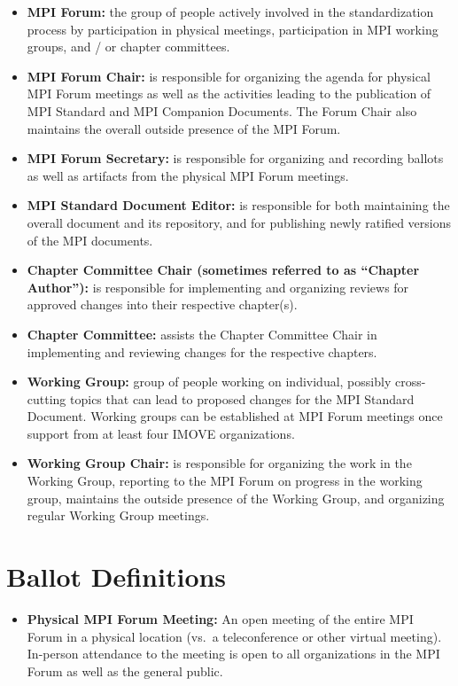 {{\begin{itemize}
\item {\bf MPI Forum:} the group of people actively involved in the
  standardization process by participation in physical meetings,
  participation in MPI working groups, and / or chapter committees.
\item {\bf MPI Forum Chair:} is responsible for organizing the agenda
  for physical MPI Forum meetings as well as the activities leading to the
  publication of MPI Standard and MPI Companion Documents. The Forum
  Chair also maintains the overall outside presence of the MPI Forum.
\item {\bf MPI Forum Secretary:} is responsible for organizing and
  recording ballots as well as artifacts from the physical MPI Forum
  meetings.
\item {\bf MPI Standard Document Editor:} is responsible for both
  maintaining the overall document and its repository, and for
  publishing newly ratified versions of the MPI documents.
\item {\bf Chapter Committee Chair (sometimes referred to as ``Chapter
  Author''):} is responsible for implementing and organizing reviews
  for approved changes into their respective chapter(s).
\item {\bf Chapter Committee:} assists the Chapter Committee Chair in
  implementing and reviewing changes for the respective chapters.
\item {\bf Working Group:} group of people working on individual,
  possibly cross-cutting topics that can lead to proposed changes for
  the MPI Standard Document. Working groups can be established at MPI
  Forum meetings once support from at least four IMOVE organizations.
\item {\bf Working Group Chair:} is responsible for organizing the
  work in the Working Group, reporting to the MPI Forum on progress in
  the working group, maintains the outside presence of the Working
  Group, and organizing regular Working Group meetings.
\end{itemize}

\section{Ballot Definitions}

\begin{itemize}
\item {\bf Physical MPI Forum Meeting:} An open meeting of the entire
  MPI Forum in a physical location (vs.\ a teleconference or other
  virtual meeting).  In-person attendance to the meeting is open to
  all organizations in the MPI Forum as well as the general public.


\end{itemize}}}
